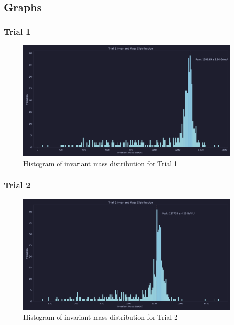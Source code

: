 \documentclass{beamer}
\begin{document}
\subsection{Graphs}
\begin{frame}
\frametitle{Trial 1}
\begin{figure}
    \centering
    \includegraphics[width=1\textwidth]{dongimages/trial1.png}
    \caption{Histogram of invariant mass distribution for Trial 1}
    \label{fig:trial1}
\end{figure}
\end{frame}

\begin{frame}
\frametitle{Trial 2}
\begin{figure}
    \centering
    \includegraphics[width=1\textwidth]{dongimages/trial2.png}
    \caption{Histogram of invariant mass distribution for Trial 2}
    \label{fig:trial2}
\end{figure}
\end{frame}
\end{document}
